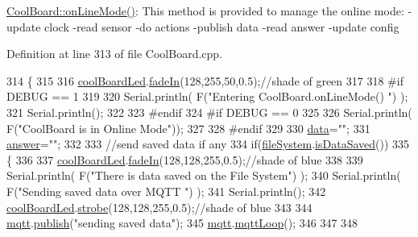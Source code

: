 \hyperlink{class_cool_board_aa0bbc4bc605e35618d18e68795c61363}{Cool\+Board\+::on\+Line\+Mode()}\+: This method is provided to manage the online mode\+: -\/update clock -\/read sensor -\/do actions -\/publish data -\/read answer -\/update config 

Definition at line 313 of file Cool\+Board.\+cpp.


\begin{DoxyCode}
314 \{
315 
316     \hyperlink{class_cool_board_a1b1d3c684a5baa56b08486e192fd8e97}{coolBoardLed}.\hyperlink{class_cool_board_led_ab778f5e7bed0ab74e3906d82110493c3}{fadeIn}(128,255,50,0.5);\textcolor{comment}{//shade of green}
317 
318 \textcolor{preprocessor}{#if DEBUG == 1}
319 
320     Serial.println( F(\textcolor{stringliteral}{"Entering CoolBoard.onLineMode() "}) );
321     Serial.println();
322 
323 \textcolor{preprocessor}{#endif}
324 \textcolor{preprocessor}{#if DEBUG == 0}
325 
326     Serial.println( F(\textcolor{stringliteral}{"CoolBoard is in Online Mode"}));
327 
328 \textcolor{preprocessor}{#endif}
329 
330     \hyperlink{class_cool_board_a427fb753dd8575bdf821c70a5c63d695}{data}=\textcolor{stringliteral}{""};
331     \hyperlink{class_cool_board_a7b835fafd449e5282f7f91d787a2dc15}{answer}=\textcolor{stringliteral}{""};
332 
333     \textcolor{comment}{//send saved data if any}
334     \textcolor{keywordflow}{if}(\hyperlink{class_cool_board_a42c2586fbb13ff7f06538e9284e8538d}{fileSystem}.\hyperlink{class_cool_file_system_ac86a40e7c3a1842f7342f698d34324f9}{isDataSaved}())
335     \{
336 
337         \hyperlink{class_cool_board_a1b1d3c684a5baa56b08486e192fd8e97}{coolBoardLed}.\hyperlink{class_cool_board_led_ab778f5e7bed0ab74e3906d82110493c3}{fadeIn}(128,128,255,0.5);\textcolor{comment}{//shade of blue}
338 
339         Serial.println( F(\textcolor{stringliteral}{"There is data saved on the File System"}) );
340         Serial.println( F(\textcolor{stringliteral}{"Sending saved data over MQTT "}) );
341         Serial.println();
342         \hyperlink{class_cool_board_a1b1d3c684a5baa56b08486e192fd8e97}{coolBoardLed}.\hyperlink{class_cool_board_led_ad5f0de4c628cbfbf49896042831c64ad}{strobe}(128,128,255,0.5);\textcolor{comment}{//shade of blue }
343 
344         \hyperlink{class_cool_board_a2399f44d7c23c1149a335cb3b46d90f1}{mqtt}.\hyperlink{class_cool_m_q_t_t_ace977b3e90ab14b1199fe5c4fb0a13ec}{publish}(\textcolor{stringliteral}{"sending saved data"});
345         \hyperlink{class_cool_board_a2399f44d7c23c1149a335cb3b46d90f1}{mqtt}.\hyperlink{class_cool_m_q_t_t_aa5eaae967b562b62cbcf2b8d81f6e5d5}{mqttLoop}();
346 
347 
348         

\end{DoxyCode}
